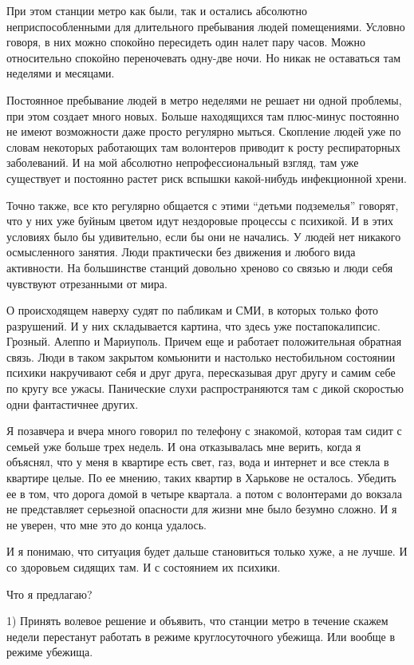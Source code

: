 При этом станции метро как были, так и остались абсолютно неприспособленными
для длительного пребывания людей помещениями. Условно говоря, в них можно
спокойно пересидеть один налет пару часов. Можно относительно спокойно
переночевать одну-две ночи. Но никак не оставаться там неделями и месяцами. 

Постоянное пребывание людей в метро неделями не решает ни одной проблемы, при
этом создает много новых. Больше находящихся там плюс-минус постоянно не имеют
возможности даже просто регулярно мыться. Скопление людей уже по словам
некоторых работающих там волонтеров приводит к росту респираторных заболеваний.
И на мой абсолютно непрофессиональный взгляд, там уже существует и постоянно
растет риск вспышки какой-нибудь инфекционной хрени.

Точно также, все кто регулярно общается с этими \enquote{детьми подземелья} говорят,
что у них уже буйным цветом идут нездоровые процессы с психикой. И в этих
условиях было бы удивительно, если бы они не начались. У людей нет никакого
осмысленного занятия. Люди практически без движения и любого вида активности.
На большинстве станций довольно хреново со связью и люди себя чувствуют
отрезанными от мира. 

О происходящем наверху судят по пабликам и СМИ, в которых только фото
разрушений. И у них складывается картина, что здесь уже постапокалипсис.
Грозный. Алеппо и Мариуполь. Причем еще и работает положительная обратная
связь. Люди в таком закрытом комьюнити и настолько нестобильном состоянии
психики накручивают себя и друг друга, пересказывая друг другу и самим себе по
кругу все ужасы. Панические слухи распространяются там с дикой скоростью одни
фантастичнее других. 

Я позавчера и вчера много говорил по телефону с знакомой, которая там сидит с
семьей уже больше трех недель. И она отказывалась мне верить, когда я объяснял,
что у меня в квартире есть свет, газ, вода и интернет и все стекла в квартире
целые. По ее мнению, таких квартир в Харькове не осталось. Убедить ее в том,
что дорога домой в четыре квартала. а потом с волонтерами до вокзала не
представляет серьезной опасности для жизни мне было безумно сложно. И я не
уверен, что мне это до конца удалось. 

И я понимаю, что ситуация будет дальше становиться только хуже, а не лучше. И
со здоровьем сидящих там. И с состоянием их психики. 

Что я предлагаю? 

1) Принять волевое решение и объявить, что станции метро в течение скажем
недели перестанут работать в режиме круглосуточного убежища. Или вообще в
режиме убежища. 


